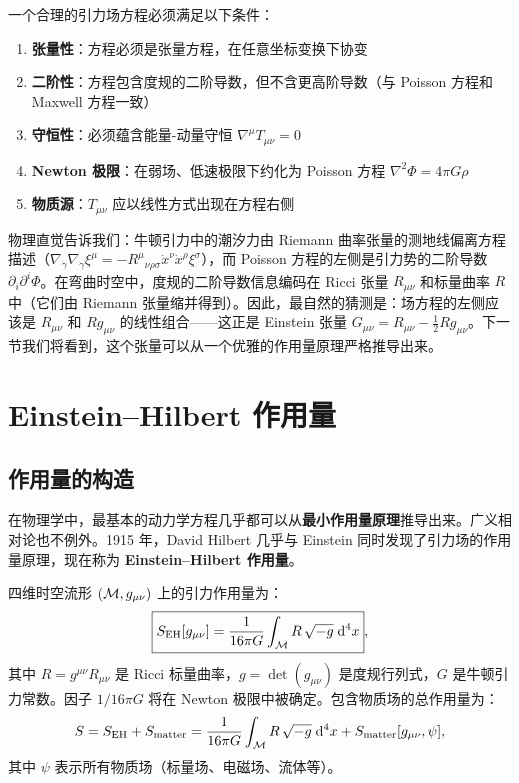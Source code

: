 \begin{definition}[构建场方程的基本要求]
一个合理的引力场方程必须满足以下条件：
\begin{enumerate}
    \item \textbf{张量性}：方程必须是张量方程，在任意坐标变换下协变
    \item \textbf{二阶性}：方程包含度规的二阶导数，但不含更高阶导数（与 Poisson 方程和 Maxwell 方程一致）
    \item \textbf{守恒性}：必须蕴含能量-动量守恒 $\nabla^\mu T_{\mu\nu} = 0$
    \item \textbf{Newton 极限}：在弱场、低速极限下约化为 Poisson 方程 $\nabla^2\Phi = 4\pi G\rho$
    \item \textbf{物质源}：$T_{\mu\nu}$ 应以线性方式出现在方程右侧
\end{enumerate}
\end{definition}

物理直觉告诉我们：牛顿引力中的潮汐力由 Riemann 曲率张量的测地线偏离方程描述（$\nabla_{\dot\gamma}\nabla_{\dot\gamma} \xi^\mu = -R^\mu{}_{\nu\rho\sigma} \dot x^\nu \dot x^\rho \xi^\sigma$），而 Poisson 方程的左侧是引力势的二阶导数 $\partial_i\partial^i\Phi$。在弯曲时空中，度规的二阶导数信息编码在 Ricci 张量 $R_{\mu\nu}$ 和标量曲率 $R$ 中（它们由 Riemann 张量缩并得到）。因此，最自然的猜测是：场方程的左侧应该是 $R_{\mu\nu}$ 和 $R g_{\mu\nu}$ 的线性组合——这正是 Einstein 张量 $G_{\mu\nu} = R_{\mu\nu} - \frac{1}{2}R g_{\mu\nu}$。下一节我们将看到，这个张量可以从一个优雅的作用量原理严格推导出来。

\section{Einstein--Hilbert 作用量}
\label{sec:EH_action}

\subsection{作用量的构造}

在物理学中，最基本的动力学方程几乎都可以从\textbf{最小作用量原理}推导出来。广义相对论也不例外。1915 年，David Hilbert 几乎与 Einstein 同时发现了引力场的作用量原理，现在称为 \textbf{Einstein--Hilbert 作用量}。

\begin{definition}
四维时空流形 $(\mathcal{M}, g_{\mu\nu})$ 上的引力作用量为：
\begin{equation}
    \boxed{S_{\text{EH}}[g_{\mu\nu}] = \frac{1}{16\pi G} \int_{\mathcal{M}} R \, \sqrt{-g} \; \dd^4 x},
    \label{eq:EH_action}
\end{equation}
其中 $R = g^{\mu\nu} R_{\mu\nu}$ 是 Ricci 标量曲率，$g = \det(g_{\mu\nu})$ 是度规行列式，$G$ 是牛顿引力常数。因子 $1/16\pi G$ 将在 Newton 极限中被确定。包含物质场的总作用量为：
\begin{equation}
    S = S_{\text{EH}} + S_{\text{matter}} = \frac{1}{16\pi G} \int_{\mathcal{M}} R \, \sqrt{-g} \; \dd^4 x + S_{\text{matter}}[g_{\mu\nu}, \psi],
    \label{eq:total_action}
\end{equation}
其中 $\psi$ 表示所有物质场（标量场、电磁场、流体等）。
\end{definition}

